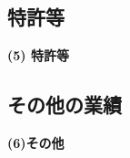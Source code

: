 {\subsection{特許等}
		\noindent
		{\bf (5) 特許等}
{%
}%

\subsection{その他の業績}
		\noindent
		{\bf (6)その他}
{%
}%


    }
\KLEndSinglePage

